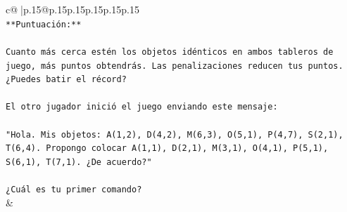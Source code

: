 \documentclass{article}
\begin{document}
{\begin{supertabular}{c@{$\;$}|p{.15\linewidth}@{}p{.15\linewidth}p{.15\linewidth}p{.15\linewidth}p{.15\linewidth}p{.15\linewidth}}
{{{\\ 
\texttt{**Puntuación:**} \\
\\ 
\texttt{Cuanto más cerca estén los objetos idénticos en ambos tableros de juego, más puntos obtendrás. Las penalizaciones reducen tus puntos. ¿Puedes batir el récord?} \\
\\ 
\texttt{El otro jugador inició el juego enviando este mensaje:} \\
\\ 
\texttt{"Hola. Mis objetos: A(1,2), D(4,2), M(6,3), O(5,1), P(4,7), S(2,1), T(6,4). Propongo colocar A(1,1), D(2,1), M(3,1), O(4,1), P(5,1), S(6,1), T(7,1). ¿De acuerdo?"} \\
\\ 
\texttt{¿Cuál es tu primer comando?} \\
            }
        }
    }
    & \\ \\


\end{supertabular}}
\end{document}

